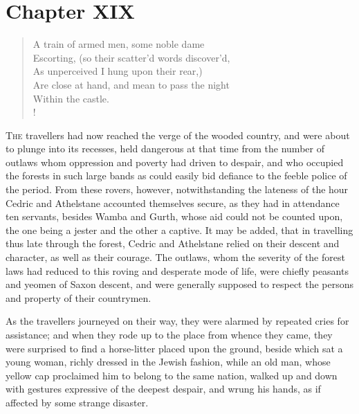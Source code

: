 \chapter{Chapter XIX}

\begin{verse}
A train of armed men, some noble dame\\
Escorting, (so their scatter'd words discover'd,\\
As unperceived I hung upon their rear,)\\
Are close at hand, and mean to pass the night\\
Within the castle.\\!
\end{verse}

\lettrine{T}{he} travellers had now reached the verge of the wooded
country, and were
about to plunge into its recesses, held dangerous at that time from the
number of outlaws whom oppression and poverty had driven to despair, and
who occupied the forests in such large bands as could easily bid
defiance to the feeble police of the period. From these rovers, however,
notwithstanding the lateness of the hour Cedric and Athelstane accounted
themselves secure, as they had in attendance ten servants, besides Wamba
and Gurth, whose aid could not be counted upon, the one being a jester
and the other a captive. It may be added, that in travelling thus late
through the forest, Cedric and Athelstane relied on their descent and
character, as well as their courage. The outlaws, whom the severity of
the forest laws had reduced to this roving and desperate mode of life,
were chiefly peasants and yeomen of Saxon descent, and were generally
supposed to respect the persons and property of their countrymen.

As the travellers journeyed on their way, they were alarmed by repeated
cries for assistance; and when they rode up to the place from whence
they came, they were surprised to find a horse-litter placed upon the
ground, beside which sat a young woman, richly dressed in the Jewish
fashion, while an old man, whose yellow cap proclaimed him to belong to
the same nation, walked up and down with gestures expressive of the
deepest despair, and wrung his hands, as if affected by some strange
disaster.

